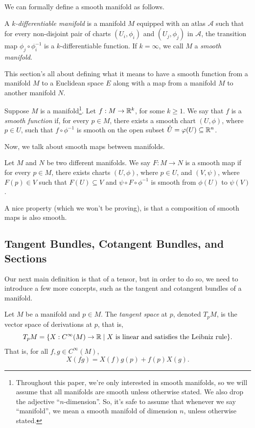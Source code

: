 We can formally define a smooth manifold as follows.
\begin{definition}
  A \emph{$k$-differentiable manifold} is a manifold $M$ equipped with an atlas $\mathcal{A}$ such that for every non-disjoint pair of charts $(U_i, \phi_i)$ and $(U_j, \phi_j)$ in $\mathcal{A}$, the transition map $\phi_j \circ \phi_i^{-1}$ is a $k$-differentiable function. If $k = \infty$, we call $M$ a \emph{smooth manifold}.
\end{definition}

\label{sub_sec:smooth_functions_and_maps}
This section's all about defining what it means to have a smooth function from a manifold $M$ to a Euclidean space $E$ along with a map from a manifold $M$ to another manifold $N$.
\begin{definition}
  Suppose $M$ is a manifold\footnote{Throughout this paper, we're only interested in smooth manifolds, so we will assume that all manifolds are smooth unless otherwise stated. We also drop the adjective ``$n$-dimension''. So, it's safe to assume that whenever we say ``manifold'', we mean a smooth manifold of dimension $n$, unless otherwise stated.}. Let $f : M \rightarrow \mathbb{R}^k$, for some $k \ge 1$. We say that $f$ is a \emph{smooth function} if, for every $p \in M$, there exists a smooth chart $(U, \phi)$, where $p \in U$, such that $f \circ \phi^{-1}$ is smooth on the open subset $\hat{U} = \varphi(U) \subseteq \mathbb{R}^n$.
\end{definition}
Now, we talk about smooth maps between manifolds.
\begin{definition}
  Let $M$ and $N$ be two different manifolds. We say $F : M \to N$ is a smooth map if for every $p \in M$, there exists charts $(U, \phi)$, where $p \in U$, and $(V, \psi)$, where $F(p) \in V$ such that $F(U) \subseteq V$ and $\psi \circ F \circ \phi^{-1}$ is smooth from $\phi(U)$ to $\psi(V)$.
\end{definition}

A nice property (which we won't be proving), is that a composition of smooth maps is also smooth.


\subsection{Tangent Bundles, Cotangent Bundles, and Sections} Our next main definition is that of a tensor, but in order to do so, we need to introduce a few more concepts, such as the tangent and cotangent bundles of a manifold.
\begin{definition}
  Let $M$ be a manifold and $p \in M$. The \emph{tangent space} at $p$, denoted $T_pM$, is the vector space of derivations at $p$, that is,
  \[%
    T_pM = \{X : C^\infty(M) \to \R \mid X~\text{is linear and satisfies the Leibniz rule}\}
  .\]%
  That is, for all $f,g \in C^\infty(M)$,
  \[%
    X(fg) = X(f)g(p) + f(p)X(g)
  .\]%
\end{definition}

